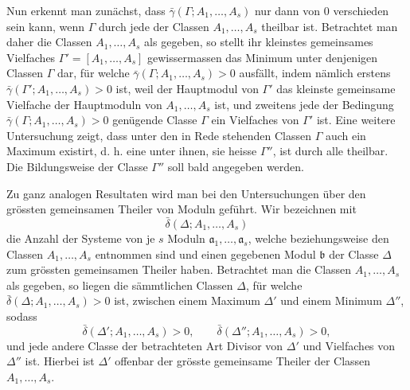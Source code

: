 Nun erkennt man zunächst, dass $\bar\gamma(\Gamma;A_1,\ldots,A_s)$ nur dann von 0 verschieden sein kann, wenn $\Gamma$ durch jede der Classen $A_1,\ldots,A_s$ theilbar ist. Betrachtet man daher die Classen $A_1,\ldots,A_s$ als gegeben, so stellt ihr kleinstes gemeinsames Vielfaches $\Gamma'=[A_1,\ldots,A_s]$ gewissermassen das Minimum unter denjenigen Classen $\Gamma$ dar, für welche $\bar\gamma(\Gamma;A_1,\ldots,A_s)>0$ ausfällt, indem nämlich erstens $\bar\gamma(\Gamma';A_1,\ldots,A_s)>0$ ist, weil der Hauptmodul von $\Gamma'$ das kleinste gemeinsame Vielfache der Hauptmoduln von $A_1,\ldots,A_s$ ist, und zweitens jede der Bedingung $\bar\gamma(\Gamma;A_1,\ldots,A_s)>0$ genügende Classe $\Gamma$ ein Vielfaches von $\Gamma'$ ist. Eine weitere Untersuchung zeigt, dass unter den in Rede stehenden Classen $\Gamma$ auch ein Maximum existirt, d. h. eine unter ihnen, sie heisse $\Gamma''$, ist durch alle theilbar. Die Bildungsweise der Classe $\Gamma''$ soll bald angegeben werden.

Zu ganz analogen Resultaten wird man bei den Untersuchungen über den grössten gemeinsamen Theiler von Moduln geführt. Wir bezeichnen mit
\[
 \bar\delta(\Delta;A_1,\ldots,A_s)
\]
die Anzahl der Systeme von je $s$ Moduln $\mathfrak a_1,\ldots,\mathfrak a_s$, welche beziehungsweise den Classen $A_1,\ldots,A_s$ entnommen sind und einen gegebenen Modul $\mathfrak b$ der Classe $\Delta$ zum grössten gemeinsamen Theiler haben. Betrachtet man die Classen $A_1,\ldots,A_s$ als gegeben, so liegen die sämmtlichen Classen $\Delta$, für welche $\bar\delta(\Delta;A_1,\ldots,A_s)>0$ ist, zwischen einem Maximum $\Delta'$ und einem Minimum $\Delta''$, sodass
\[
 \bar\delta(\Delta';A_1,\ldots,A_s)>0,
 \qquad
 \bar\delta(\Delta'';A_1,\ldots,A_s)>0,
\]
und jede andere Classe der betrachteten Art Divisor von $\Delta'$ und Vielfaches von $\Delta''$ ist. Hierbei ist $\Delta'$ offenbar der grösste gemeinsame Theiler der Classen $A_1,\ldots,A_s$.

